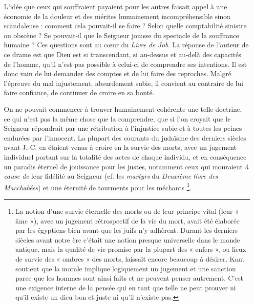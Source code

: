  L'idée que ceux qui souffraient payaient pour les autres faisait appel à une économie de la douleur et des mérites humainement incompréhensible sinon scandaleuse : comment cela pouvait-il se faire ? Selon quelle comptabilité sinistre ou obscène ? Se pouvait-il que le Seigneur jouisse du spectacle de la souffrance humaine ? Ces questions sont au cœur du \emph{Livre de Job}. La réponse de l'auteur de ce drame est que Dieu est si transcendant, si au-dessus et au-delà des capacités de l'homme, qu'il n'est pas possible à celui-ci de comprendre ses intentions. Il est donc vain de lui demander des comptes et de lui faire des reproches. Malgré l'épreuve du mal injustement, absurdement subie, il convient au contraire de lui faire confiance, de continuer de croire en sa bonté. 

 On ne pouvait commencer à trouver humainement cohérente une telle doctrine, ce qui n'est pas la même chose que la comprendre, que si l'on croyait que le Seigneur répondrait par une rétribution  à l'injustice subie et à toutes les peines endurées par l'innocent. La plupart des courants du judaïsme des derniers siècles avant J.-C. en étaient venus à croire en la survie des morts, avec un jugement individuel portant sur la totalité des actes de chaque individu, et en conséquence un paradis éternel de jouissance pour les justes, notamment ceux qui mouraient \emph{à cause de} leur fidélité au Seigneur (cf. les \emph{martyrs} du \emph{Deuxième livre des Macchabées}) et une éternité de tourments pour les méchants%
\footnote{La notion d'une survie éternelle des morts ou de leur principe vital (leur « âme »), avec un jugement rétrospectif de la vie du mort, avait été élaborée par les égyptiens bien avant que les juifs n'y adhèrent. Durant les derniers siècles avant notre ère c'était une notion presque universelle dans le monde antique, mais la qualité de vie promise par la plupart des « enfers », ou lieux de survie des « ombres » des morts, laissait encore beaucoup à désirer. Kant soutient que la morale implique logiquement un jugement et une sanction  parce que les hommes sont ainsi faits et ne peuvent penser autrement. C'est une exigence interne de la pensée qui en tant que telle ne peut prouver ni qu'il existe un dieu bon et juste  ni qu'il n'existe pas.}.


